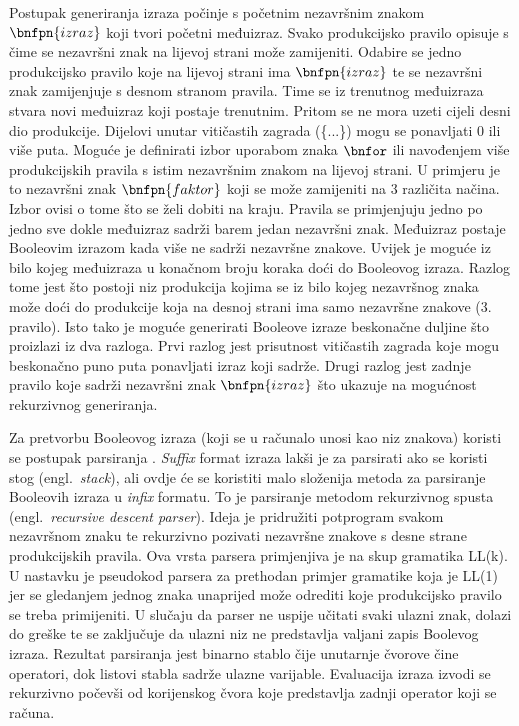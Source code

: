 \documentclass[times, utf8, diplomski]{fer}
\begin{document}
Postupak generiranja izraza počinje s početnim nezavršnim znakom $\bnfpn{izraz}$ koji tvori početni međuizraz. Svako produkcijsko pravilo opisuje s čime se nezavršni znak na lijevoj strani može zamijeniti. Odabire se jedno produkcijsko pravilo koje na lijevoj strani ima $\bnfpn{izraz}$ te se nezavršni znak zamijenjuje s desnom stranom pravila. Time se iz trenutnog međuizraza stvara novi međuizraz koji postaje trenutnim. Pritom se ne mora uzeti cijeli desni dio produkcije. Dijelovi unutar vitičastih zagrada (\{...\}) mogu se ponavljati $0$ ili više puta. Moguće je definirati izbor uporabom znaka $\bnfor$ ili navođenjem više produkcijskih pravila s istim nezavršnim znakom na lijevoj strani. U primjeru je to nezavršni znak $\bnfpn{faktor}$ koji se može zamijeniti na $3$ različita načina. Izbor ovisi o tome što se želi dobiti na kraju. Pravila se primjenjuju jedno po jedno sve dokle međuizraz sadrži barem jedan nezavršni znak. Međuizraz postaje Booleovim izrazom kada više ne sadrži nezavršne znakove. Uvijek je moguće iz bilo kojeg međuizraza u konačnom broju koraka doći do Booleovog izraza. Razlog tome jest što postoji niz produkcija kojima se iz bilo kojeg nezavršnog znaka može doći do produkcije koja na desnoj strani ima samo nezavršne znakove ($3.$ pravilo). Isto tako je moguće generirati Booleove izraze beskonačne duljine što proizlazi iz dva razloga. Prvi razlog jest prisutnost vitičastih zagrada koje mogu beskonačno puno puta ponavljati izraz koji sadrže. Drugi razlog jest zadnje pravilo koje sadrži nezavršni znak $\bnfpn{izraz}$ što ukazuje na mogućnost rekurzivnog generiranja.

Za pretvorbu Booleovog izraza (koji se u računalo unosi kao niz znakova) koristi se postupak parsiranja \cite{book:ppj}. \textit{Suffix} format izraza lakši je za parsirati ako se koristi stog (engl.~\textit{stack}), ali ovdje će se koristiti malo složenija metoda za parsiranje Booleovih izraza u \textit{infix} formatu. To je parsiranje metodom rekurzivnog spusta (engl.~\textit{recursive descent parser}). Ideja je pridružiti potprogram svakom nezavršnom znaku te rekurzivno pozivati nezavršne znakove s desne strane produkcijskih pravila. Ova vrsta parsera primjenjiva je na skup gramatika LL(k). U nastavku je pseudokod parsera za prethodan primjer gramatike koja je LL(1) jer se gledanjem jednog znaka unaprijed može odrediti koje produkcijsko pravilo se treba primijeniti. U slučaju da parser ne uspije učitati svaki ulazni znak, dolazi do greške te se zaključuje da ulazni niz ne predstavlja valjani zapis Boolevog izraza. Rezultat parsiranja jest binarno stablo čije unutarnje čvorove čine operatori, dok listovi stabla sadrže ulazne varijable. Evaluacija izraza izvodi se rekurzivno počevši od korijenskog čvora koje predstavlja zadnji operator koji se računa.
\end{document}
